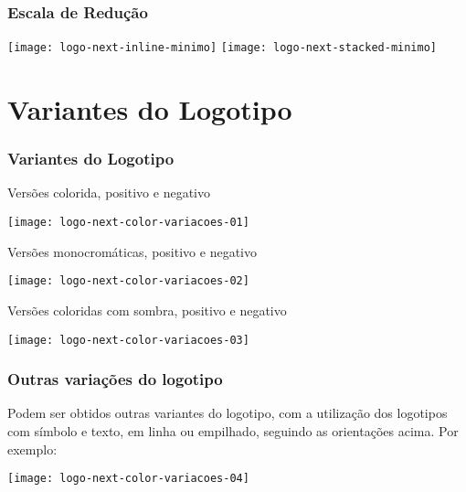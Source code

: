 \documentclass[10pt,aspectratio=43,xcolor,compress]{beamer}
\begin{document}
\begin{frame}
  \frametitle{Escala de Redução}

  \vfill
  \centering
  \texttt{[image: logo-next-inline-minimo]}
  \vfill
  \centering
  \texttt{[image: logo-next-stacked-minimo]}
  \vfill
  
\end{frame}

\section{Variantes do Logotipo}

\begin{frame}
  \frametitle{Variantes do Logotipo}

  \noindent Versões colorida, positivo e negativo

  \centering
  \texttt{[image: logo-next-color-variacoes-01]}

  \noindent Versões monocromáticas, positivo e negativo

  \centering
  \texttt{[image: logo-next-color-variacoes-02]}

  \noindent Versões coloridas com sombra, positivo e negativo

  \centering
  \texttt{[image: logo-next-color-variacoes-03]}

\end{frame}

\begin{frame}
  \frametitle{Outras variações do logotipo}

  Podem ser obtidos outras variantes do logotipo, com a utilização dos logotipos
  com símbolo e texto, em linha ou empilhado, seguindo as orientações acima. Por
  exemplo:

  \vfill
  \centering
  \texttt{[image: logo-next-color-variacoes-04]}
  \vfill

\end{frame}
\end{document}
